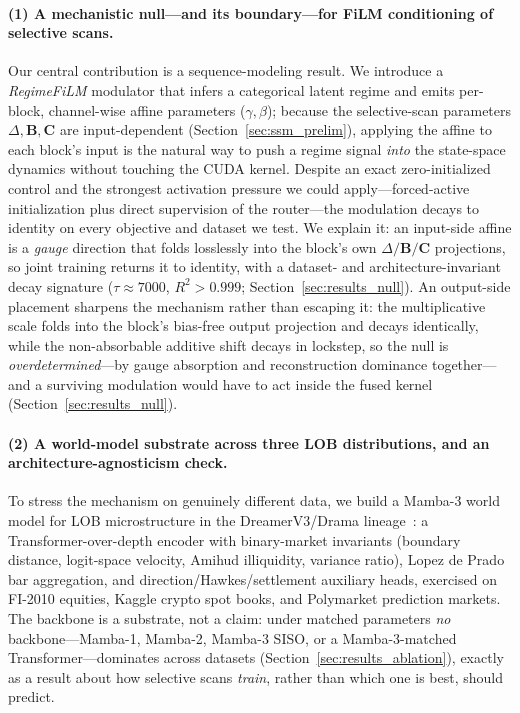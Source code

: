 \documentclass{article}
\begin{document}
\paragraph{(1) A mechanistic null---and its boundary---for FiLM
conditioning of selective scans.}
Our central contribution is a sequence-modeling result.  We introduce a
\emph{RegimeFiLM} modulator that infers a categorical latent regime and
emits per-block, channel-wise affine parameters ($\gamma,\beta$); because
the selective-scan parameters $\Delta,\mathbf{B},\mathbf{C}$ are
input-dependent (Section~\ref{sec:ssm_prelim}), applying the affine to each
block's input is the natural way to push a regime signal \emph{into} the
state-space dynamics without touching the CUDA kernel.  Despite an exact
zero-initialized control and the strongest activation pressure we could
apply---forced-active initialization plus direct supervision of the
router---the modulation decays to identity on every objective and dataset
we test.  We explain it: an input-side affine is a \emph{gauge} direction
that folds losslessly into the block's own $\Delta/\mathbf{B}/\mathbf{C}$
projections, so joint training returns it to identity, with a dataset- and
architecture-invariant decay signature ($\tau\approx7000$, $R^2>0.999$;
Section~\ref{sec:results_null}).  An output-side placement sharpens
the mechanism rather than escaping it: the multiplicative scale folds into the
block's bias-free output projection and decays identically, while the
non-absorbable additive shift decays in lockstep, so the null is
\emph{overdetermined}---by gauge absorption and reconstruction dominance
together---and a surviving modulation would have to act inside the fused kernel
(Section~\ref{sec:results_null}).

\paragraph{(2) A world-model substrate across three LOB distributions, and
an architecture-agnosticism check.}
To stress the mechanism on genuinely different data, we build a Mamba-3
world model for LOB microstructure in the DreamerV3/Drama
lineage~\citep{hafner2023dreamerv3, wang2024drama, lahoti2026mamba3}: a
Transformer-over-depth encoder with binary-market invariants (boundary
distance, logit-space velocity, Amihud illiquidity, variance ratio), Lopez
de Prado bar aggregation, and direction/Hawkes/settlement auxiliary heads,
exercised on FI-2010 equities, Kaggle crypto spot books, and Polymarket
prediction markets.  The backbone is a substrate, not a claim: under
matched parameters \emph{no} backbone---Mamba-1, Mamba-2, Mamba-3 SISO, or
a Mamba-3-matched Transformer---dominates across datasets
(Section~\ref{sec:results_ablation}), exactly as a result about how
selective scans \emph{train}, rather than which one is best, should predict.
\end{document}
